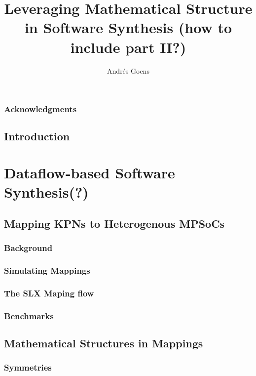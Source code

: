 \documentclass{report}
\title{Leveraging Mathematical Structure in Software Synthesis (how to include part II?)}
\author{Andr\'{e}s Goens}
\begin{document}

\date{}

\maketitle
\tableofcontents
\clearpage
\section*{Acknowledgments}


\chapter{Introduction}


\part{Dataflow-based Software Synthesis(?)}

\chapter{Mapping KPNs to Heterogenous MPSoCs}

\section{Background}

\section{Simulating Mappings}

\section{The SLX Maping flow}

\section{Benchmarks}


\chapter{Mathematical Structures in Mappings}

\section{Symmetries}
\end{document}
